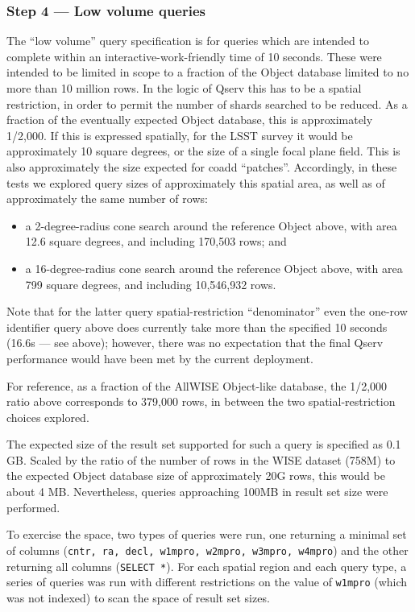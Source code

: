 \subsubsection{Step 4 --- Low volume queries}

The ``low volume'' query specification is for queries which are intended to complete within an interactive-work-friendly time of 10 seconds.
These were intended to be limited in scope to a fraction of the Object database limited to no more than 10 million rows.
In the logic of Qserv this has to be a spatial restriction, in order to permit the number of shards searched to be reduced.
As a fraction of the eventually expected Object database, this is approximately 1/2,000.
If this is expressed spatially, for the LSST survey it would be approximately 10 square degrees,
or the size of a single focal plane field.
This is also approximately the size expected for coadd ``patches''.
Accordingly, in these tests we explored query sizes of approximately this spatial area, as well as of approximately the same number of rows:

\begin{itemize}
\item{a 2-degree-radius cone search around the reference Object above, with area 12.6 square degrees,
and including 170,503 rows; and}
\item{a 16-degree-radius cone search around the reference Object above, with area 799 square degrees,
and including 10,546,932 rows.}
\end{itemize}

Note that for the latter query spatial-restriction ``denominator'' even the one-row identifier query above does currently take more than the specified 10 seconds (16.6s --- see above);
however, there was no expectation that the final Qserv performance would have been met by the current deployment.

For reference, as a fraction of the AllWISE Object-like database, the 1/2,000 ratio above corresponds to 379,000 rows, in between the two spatial-restriction choices explored.

The expected size of the result set supported for such a query is specified as 0.1 GB.
Scaled by the ratio of the number of rows in the WISE dataset (758M) to the expected Object database size of approximately 20G rows, this would be about 4 MB.
Nevertheless, queries approaching 100MB in result set size were performed.

To exercise the space, two types of queries were run, one returning a minimal set of columns (\texttt{cntr, ra, decl, w1mpro, w2mpro, w3mpro, w4mpro}) and the other returning all columns (\texttt{SELECT *}).
For each spatial region and each query type, a series of queries was run with different restrictions on the value of \verb|w1mpro| (which was not indexed) to scan the space of result set sizes.

